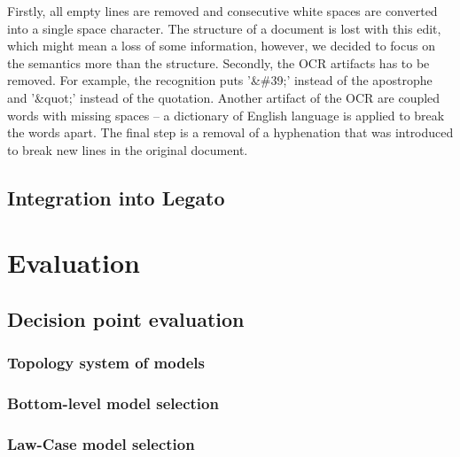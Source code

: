 \documentclass[
  digital, %
  table,   %
  lof,     %
  lot,     %
]{fithesis3}
\begin{document}
Firstly, all empty lines are removed and consecutive white spaces are converted into a single space character.
The structure of a document is lost with this edit, which might mean a loss of some information, however, we decided to focus on the semantics more than the structure.
Secondly, the OCR artifacts has to be removed.
For example, the recognition puts '\&\#39;' instead of the apostrophe and '\&quot;' instead of the quotation.
Another artifact of the OCR are coupled words with missing spaces -- a dictionary of English language is applied to break the words apart.
The final step is a removal of a hyphenation that was introduced to break new lines in the original document.

\section{Integration into Legato}

\chapter{Evaluation}
\label{chp:evaluation}

\section{Decision point evaluation}

\subsection{Topology system of models}

\subsection{Bottom-level model selection}
\label{eval:bottom-model-selection}

\subsection{Law-Case model selection}
\label{eval:law-case-model-selection}
\end{document}
